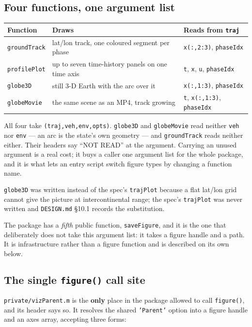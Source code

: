 \documentclass[11pt]{article}
\newcommand{\code}[1]{\texttt{#1}}
\begin{document}
\subsection{Four functions, one argument list}

\begin{center}
\begin{tabular}{lll}
\toprule
Function & Draws & Reads from \code{traj} \\
\midrule
\code{groundTrack} & lat/lon track, one coloured segment per phase & \code{x(:,2:3)}, \code{phaseIdx} \\
\code{profilePlot} & up to seven time-history panels on one time axis & \code{t}, \code{x}, \code{u}, \code{phaseIdx} \\
\code{globe3D}     & still 3-D Earth with the arc over it & \code{x(:,1:3)}, \code{phaseIdx} \\
\code{globeMovie}  & the same scene as an MP4, track growing & \code{t}, \code{x(:,1:3)}, \code{phaseIdx} \\
\bottomrule
\end{tabular}
\end{center}

All four take \code{(traj,veh,env,opts)}. \code{globe3D} and
\code{globeMovie} read neither \code{veh} nor \code{env} --- an arc is the
state's own geometry --- and \code{groundTrack} reads neither either. Their
headers say ``NOT READ'' at the argument. Carrying an unused argument is a real
cost; it buys a caller one argument list for the whole package, and it is what
lets an entry script switch figure types by changing a function name.

\code{globe3D} was written instead of the spec's \code{trajPlot} because a flat
lat/lon grid cannot give the picture at intercontinental range; the spec's
\code{trajPlot} was never written and \code{DESIGN.md} \S10.1 records the
substitution.

The package has a \emph{fifth} public function, \code{saveFigure}, and it is the
one that deliberately does not take this argument list: it takes a figure handle
and a path. It is infrastructure rather than a figure function and is described
on its own below.

\subsection{The single \code{figure()} call site}

\code{private/vizParent.m} is the \textbf{only} place in the package allowed to
call \code{figure()}, and its header says so. It resolves the shared
\code{'Parent'} option into a figure handle and an axes array, accepting three
forms:
\end{document}
